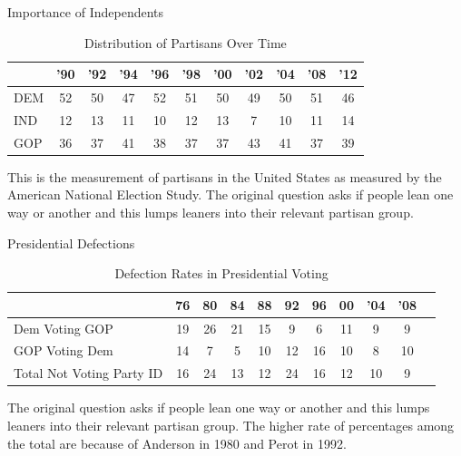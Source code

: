 \documentclass{beamer}
\begin{document}
\begin{frame}{Importance of Independents}
\begin{table}
\centering
\begin{threeparttable}
\caption*{Distribution of Partisans Over Time}
\begin{tabular}{lcccccccccc}\toprule
	&	'90	&	'92	&	'94	&	'96	&	'98	&	'00	&	'02	&	'04	&	'08	&	'12	\\ \midrule
DEM	&	52	&	50	&	47	&	52	&	51	&	50	&	49	&	50	&	51	&	46	\\
IND	&	12	&	13	&	11	&	10	&	12	&	13	&	7	&	10	&	11	&	14	\\
GOP	&	36	&	37	&	41	&	38	&	37	&	37	&	43	&	41	&	37	&	39	\\ \bottomrule
\end{tabular}
\begin{tablenotes}
\tiny
\item This is the measurement of partisans in the United States as measured by the American National Election Study. The original question asks if people lean one way or another and this lumps leaners into their relevant partisan group.
\end{tablenotes}
\end{threeparttable}
\end{table}
\end{frame}

\begin{frame}{Presidential Defections}
\begin{table}
\centering
\begin{threeparttable}
\caption*{Defection Rates in Presidential Voting}
\begin{tabular}{lcccccccccc}\toprule
	&	76	&	80	&	84	&	88	&	92	&	96	&	00	&	'04	&	'08	\\ \midrule
Dem Voting GOP	&	19	&	26	&	21	&	15	&	9	&	6	&	11	&	9	&	9	\\
GOP Voting Dem	&	14	&	7	&	5	&	10	&	12	&	16	&	10	&	8	&	10	\\
Total Not Voting Party ID	&	16	&	24	&	13	&	12	&	24	&	16	&	12	&	10	&	9	\\ \bottomrule
\end{tabular}
\begin{tablenotes}
\tiny
\item The original question asks if people lean one way or another and this lumps leaners into their relevant partisan group. The higher rate of percentages among the total are because of Anderson in 1980 and Perot in 1992.
\end{tablenotes}
\end{threeparttable}
\end{table}
\end{frame}
\end{document}
